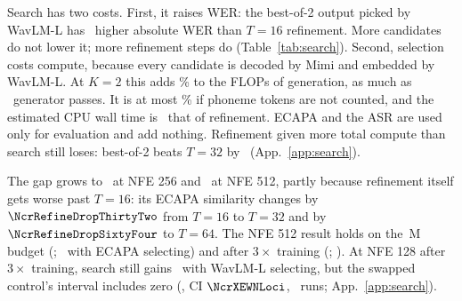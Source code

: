 Search has two costs. First, it raises WER: the best-of-2 output picked by WavLM-L has
\NcrLedgerSearchWER\ higher absolute WER than $T{=}16$ refinement. More candidates do not
lower it; more refinement steps do (Table~\ref{tab:search}).
Second, selection costs compute, because every candidate is decoded by Mimi and embedded by
WavLM-L. At $K{=}2$ this adds \NcrCostTwopct\% to the FLOPs of generation, as much as
\NcrCostTwonfe\ generator passes. It is at most \NcrCostTwobound\% if phoneme tokens are not
counted, and the estimated CPU wall time is \NcrWallTworatio\ that of refinement. ECAPA and the ASR are used
only for evaluation and add nothing. Refinement given more total compute than search still
loses: best-of-2 beats $T{=}32$ by \NcrEqualTwod\ (App.~\ref{app:search}).

The gap grows to \NcrMatchMidd\ at NFE 256 and \NcrMatchHid\ at NFE 512, partly because
refinement itself gets worse past $T{=}16$: its ECAPA similarity changes by $\NcrRefineDropThirtyTwo$ from $T{=}16$ to $T{=}32$ and by
$\NcrRefineDropSixtyFour$ to $T{=}64$. The NFE 512 result holds on the \NmaxNfour\,M budget
(\NscopeDd; \NcrXEWDd\ with ECAPA selecting) and after $3\times$ training (\NscopeNd;
\NcrXEWNd). At NFE 128 after $3\times$ training, search still gains \NcrXWENLod\ with WavLM-L
selecting, but the swapped control's interval includes zero (\NcrXEWNLod, CI $\NcrXEWNLoci$,
\NcrXNRuns\ runs; App.~\ref{app:search}).

